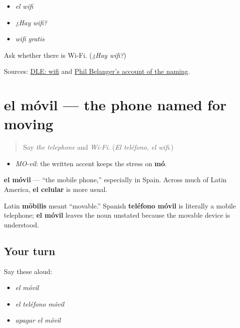 \begin{itemize}
\raggedright
  \item \emph{el wifi}
  \item \emph{¿Hay wifi?}
  \item \emph{wifi gratis}
\end{itemize}

\begin{tcolorbox}[breakable,colback=teal!4,colframe=teal!35!black,title={Before you move on}]
Ask whether there is Wi-Fi. (\emph{¿Hay wifi?})

Sources: \href{https://dle.rae.es/wifi}{DLE: wifi} and \href{https://boingboing.net/2005/11/08/wifi-isnt-short-for.html}{Phil Belanger's account of the naming}.
\end{tcolorbox}
\section[el móvil]{el móvil — the phone named for moving}

\label{lesson:ES-C404-movil}



\begin{quote}
Say \emph{the telephone} and \emph{Wi-Fi}. (\emph{El teléfono, el wifi}.)
\end{quote}

\begin{sounds}
\begin{itemize}
\raggedright
  \item \emph{MO-vil}: the written accent keeps the stress on \textbf{mó}.
\end{itemize}
\end{sounds}

\begin{cousinweb}
\textbf{el móvil} — “the mobile phone,” especially in Spain. Across much of Latin America, \textbf{el celular} is more usual.

Latin \textbf{mōbilis} meant “movable.” Spanish \textbf{teléfono móvil} is literally a mobile telephone; \textbf{el móvil} leaves the noun unstated because the movable device is understood.
\end{cousinweb}

\subsection*{Your turn}
Say these aloud:

\begin{itemize}
\raggedright
  \item \emph{el móvil}
  \item \emph{el teléfono móvil}
  \item \emph{apagar el móvil}
\end{itemize}

